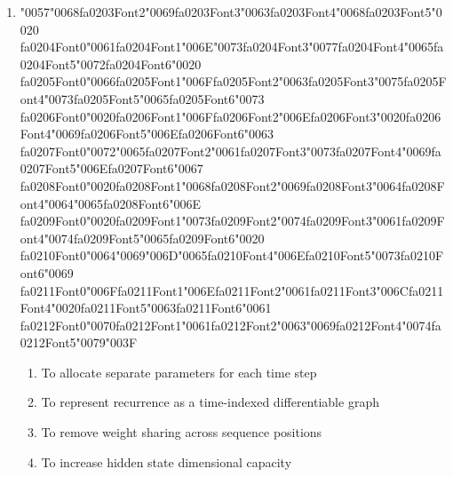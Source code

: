 \documentclass[12pt]{article}
\begin{document}
\begin{enumerate}[label=Q\arabic*.]
 \item {\char"0057}{\char"0068}{\csname fa0203Font2\endcsname\char"0069}{\csname fa0203Font3\endcsname\char"0063}{\csname fa0203Font4\endcsname\char"0068}{\csname fa0203Font5\endcsname\char"0020} {\csname fa0204Font0\endcsname\char"0061}{\csname fa0204Font1\endcsname\char"006E}{\char"0073}{\csname fa0204Font3\endcsname\char"0077}{\csname fa0204Font4\endcsname\char"0065}{\csname fa0204Font5\endcsname\char"0072}{\csname fa0204Font6\endcsname\char"0020} {\csname fa0205Font0\endcsname\char"0066}{\csname fa0205Font1\endcsname\char"006F}{\csname fa0205Font2\endcsname\char"0063}{\csname fa0205Font3\endcsname\char"0075}{\csname fa0205Font4\endcsname\char"0073}{\csname fa0205Font5\endcsname\char"0065}{\csname fa0205Font6\endcsname\char"0073} {\csname fa0206Font0\endcsname\char"0020}{\csname fa0206Font1\endcsname\char"006F}{\csname fa0206Font2\endcsname\char"006E}{\csname fa0206Font3\endcsname\char"0020}{\csname fa0206Font4\endcsname\char"0069}{\csname fa0206Font5\endcsname\char"006E}{\csname fa0206Font6\endcsname\char"0063} {\csname fa0207Font0\endcsname\char"0072}{\char"0065}{\csname fa0207Font2\endcsname\char"0061}{\csname fa0207Font3\endcsname\char"0073}{\csname fa0207Font4\endcsname\char"0069}{\csname fa0207Font5\endcsname\char"006E}{\csname fa0207Font6\endcsname\char"0067} {\csname fa0208Font0\endcsname\char"0020}{\csname fa0208Font1\endcsname\char"0068}{\csname fa0208Font2\endcsname\char"0069}{\csname fa0208Font3\endcsname\char"0064}{\csname fa0208Font4\endcsname\char"0064}{\char"0065}{\csname fa0208Font6\endcsname\char"006E} {\csname fa0209Font0\endcsname\char"0020}{\csname fa0209Font1\endcsname\char"0073}{\csname fa0209Font2\endcsname\char"0074}{\csname fa0209Font3\endcsname\char"0061}{\csname fa0209Font4\endcsname\char"0074}{\csname fa0209Font5\endcsname\char"0065}{\csname fa0209Font6\endcsname\char"0020} {\csname fa0210Font0\endcsname\char"0064}{\char"0069}{\char"006D}{\char"0065}{\csname fa0210Font4\endcsname\char"006E}{\csname fa0210Font5\endcsname\char"0073}{\csname fa0210Font6\endcsname\char"0069} {\csname fa0211Font0\endcsname\char"006F}{\csname fa0211Font1\endcsname\char"006E}{\csname fa0211Font2\endcsname\char"0061}{\csname fa0211Font3\endcsname\char"006C}{\csname fa0211Font4\endcsname\char"0020}{\csname fa0211Font5\endcsname\char"0063}{\csname fa0211Font6\endcsname\char"0061} {\csname fa0212Font0\endcsname\char"0070}{\csname fa0212Font1\endcsname\char"0061}{\csname fa0212Font2\endcsname\char"0063}{\char"0069}{\csname fa0212Font4\endcsname\char"0074}{\csname fa0212Font5\endcsname\char"0079}{\char"003F}
 \begin{enumerate}[label=(\Alph*)]
     \item To allocate separate parameters for each time step
     \item To represent recurrence as a time-indexed differentiable graph
     \item To remove weight sharing across sequence positions
     \item To increase hidden state dimensional capacity
 \end{enumerate}
 

\end{enumerate}
\end{document}
